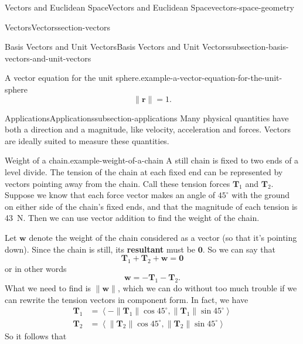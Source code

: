 \documentclass[oneside,10pt,]{book}
\newcommand{\terminology}[1]{\textbf{#1}}
\numberwithin{equation}{section}
\newcommand{\vv}[1]{\mathbf{#1}}
\newcommand{\dotprod}[1]{\left\langle #1 \right\rangle}
\begin{document}
\begin{chapterptx}{Vectors and Euclidean Space}{}{Vectors and Euclidean Space}{}{}{vectors-space-geometry}
\begin{sectionptx}{Vectors}{}{Vectors}{}{}{section-vectors}
\begin{subsectionptx}{Basis Vectors and Unit Vectors}{}{Basis Vectors and Unit Vectors}{}{}{subsection-basis-vectors-and-unit-vectors}
\begin{example}{A vector equation for the unit sphere.}{example-a-vector-equation-for-the-unit-sphere}
%
\begin{equation*}
\|\vv{r}\| = 1.
\end{equation*}
\end{example}
%
\end{subsectionptx}
%
%
\typeout{************************************************}
\typeout{************************************************}
%
\begin{subsectionptx}{Applications}{}{Applications}{}{}{subsection-applications}
\hypertarget{p-1117}{}%
Many physical quantities have both a direction and a magnitude, like velocity, acceleration and forces. Vectors are ideally suited to measure these quantities.%
\begin{example}{Weight of a chain.}{example-weight-of-a-chain}%
\hypertarget{p-1118}{}%
A still chain is fixed to two ends of a level divide. The tension of the chain at each fixed end can be represented by vectors pointing away from the chain. Call these tension forces \(\vv{T}_{1}\) and \(\vv{T}_{2}\). Suppose we know that each force vector makes an angle of \(45^{\circ}\) with the ground on either side of the chain's fixed ends, and that the magnitude of each tension is \SI{43}{\newton}. Then we can use vector addition to find the weight of the chain.%
\par
\hypertarget{p-1119}{}%
Let \(\vv{w}\) denote the weight of the chain considered as a vector (so that it's pointing down). Since the chain is still, its \terminology{resultant}\footnotemark{} must be \(\vv{0}\). So we can say that%
%
\begin{equation*}
\vv{T}_{1}+\vv{T}_{2} + \vv{w} = \vv{0}
\end{equation*}
\hypertarget{p-1120}{}%
or in other words%
%
\begin{equation*}
\vv{w} = -\vv{T}_{1}-\vv{T}_{2}.
\end{equation*}
\hypertarget{p-1121}{}%
What we need to find is \(\|\vv{w}\|\), which we can do without too much trouble if we can rewrite the tension vectors in component form. In fact, we have%
%
\begin{align*}
\vv{T}_{1} & = \dotprod{-\|\vv{T}_{1}\|\cos45^{\circ},\|\vv{T}_{1}\|\sin45^{\circ}} \\
\vv{T}_{2} & = \dotprod{\|\vv{T}_{2}\|\cos45^{\circ},\|\vv{T}_{2}\|\sin45^{\circ}} 
\end{align*}
\hypertarget{p-1122}{}%
So it follows that%
%
\begin{align*}

\end{align*}
\end{example}
\end{subsectionptx}
\end{sectionptx}
\end{chapterptx}
\end{document}
